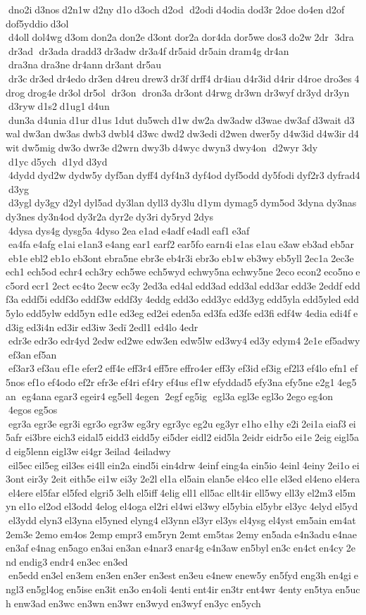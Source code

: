  dno2i d3nos d2n1w d2ny d1o d3och d2od  d2odi d4odia dod3r 2doe do4en d2of 	dof5yddio d3ol  d4oll dol4wg d3om don2a don2e d3ont dor2a dor4da dor5we dos3 do2w 2dr  3dra  dr3ad  dr3ada dradd3 dr3adw dr3a4f dr5aid dr5ain dram4g dr4an  dra3na dra3ne dr4ann dr3ant dr5au  dr3c dr3ed dr4edo dr3en d4reu drew3 dr3f drff4 dr4iau d4r3id d4rir d4roe dro3es 4drog drog4e dr3ol dr5ol  dr3on  dron3a dr3ont d4rwg dr3wn dr3wyf dr3yd dr3yn  d3ryw d1s2 d1ug1 d4un  dun3a d4unia d1ur d1us 1dut du5wch d1w dw2a dw3adw d3wae dw3af d3wait d3wal dw3an dw3as dwb3 dwbl4 d3wc dwd2 dw3edi d2wen dwer5y d4w3id d4w3ir d4wit dw5mig dw3o dwr3e d2wrn dwy3b d4wyc dwyn3 dwy4on  d2wyr 3dy  d1yc d5ych  d1yd d3yd  4dydd dyd2w dydw5y dyf5an dyff4 dyf4n3 dyf4od dyf5odd dy5fodi dyf2r3 dyfrad4 d3yg  d3ygl dy3gy d2yl dyl5ad dy3lan dyll3 dy3lu d1ym dymag5 dym5od 3dyna dy3nas dy3nes dy3n4od dy3r2a dyr2e dy3ri dy5ryd 2dys  4dysa dys4g dysg5a 4dyso 2ea e1ad e4adf e4adl eaf1 e3af  ea4fa e4afg e1ai e1an3 e4ang ear1 earf2 ear5fo earn4i e1as e1au e3aw eb3ad eb5ar  eb1e ebl2 eb1o eb3ont ebra5ne ebr3e eb4r3i ebr3o eb1w eb3wy eb5yll 2ec1a 2ec3e ech1 ech5od echr4 ech3ry ech5we ech5wyd echwy5na echwy5ne 2eco econ2 eco5no ec5ord ecr1 2ect ec4to 2ecw ec3y 2ed3a ed4al edd3ad edd3al edd3ar edd3e 2eddf eddf3a eddf5i eddf3o eddf3w eddf3y 4eddg edd3o edd3yc edd3yg edd5yla edd5yled edd5ylo edd5ylw edd5yn ed1e ed3eg ed2ei eden5a ed3fa ed3fe ed3fi edf4w 4edia edi4f ed3ig ed3i4n ed3ir ed3iw 3edï 2edl1 ed4lo 4edr  edr3e edr3o edr4yd 2edw ed2we edw3en edw5lw ed3wy4 ed3y edym4 2e1e ef5adwy  ef3an ef5an  ef3ar3 ef3au ef1e efer2 eff4e eff3r4 eff5re effro4er eff3y ef3id ef3ig ef2l3 ef4lo efn1 ef5nos ef1o ef4odo ef2r efr3e ef4ri ef4ry ef4us ef1w efyddad5 efy3na efy5ne e2g1 4eg5an  eg4ana egar3 egeir4 eg5ell 4egen  2egf eg5ig  egl3a egl3e egl3o 2ego eg4on  4egos eg5os  egr3a egr3e egr3i egr3o egr3w eg3ry egr3yc eg2u eg3yr e1ho e1hy e2i 2ei1a eiaf3 ei5afr ei3bre eich3 eidal5 eidd3 eidd5y ei5der eidl2 eid5la 2eidr eidr5o ei1e 2eig eigl5ad eig5lenn eigl3w ei4gr 3eilad 	4eiladwy  eil5ec eil5eg eil3es ei4ll ein2a eind5i ein4drw 4einf eing4a ein5io 4einl 4einy 2ei1o ei3ont eir3y 2eit eith5e ei1w ei3y 2e2l el1a el5ain elan5e el4co el1e el3ed el4eno el4era el4ere el5far el5fed elgri5 3elh el5iff 4elig ell1 ell5ac ellt4ir ell5wy ell3y el2m3 el5myn el1o el2od el3odd 4elog el4oga el2ri el4wi el3wy el5ybia el5ybr el3yc 4elyd el5yd  el3ydd elyn3 el3yna el5yned elyng4 el3ynn el3yr el3ys el4ysg el4yst em5ain em4at 2em3e 2emo em4os 2emp empr3 em5ryn 2emt em5tas 2emy en5ada e4n3adu e4nae en3af e4nag en5ago en3ai en3an e4nar3 enar4g e4n3aw en5byl en3c en4ct en4cy 2end endig3 endr4 en3ec en3ed  en5edd en3el en3em en3en en3er en3est en3eu e4new enew5y en5fyd eng3h en4gi engl3 en5gl4og en5ise en3it en3o en4oli 4enti ent4ir en3tr ent4wr 4enty en5tya en5uch enw3ad en3wc en3wn en3wr en3wyd en3wyf en3yc en5ych 